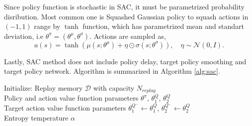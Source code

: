 Since policy function is stochastic in SAC, it must be parametrized probability disribution. Most common one is 
Squashed Gaussian policy to squash actions in $(-1,1)$ range by $\tanh$ function, which has parametrized mean and standart deviation, i.e $\theta^{\pi}=(\theta^{\mu}, \theta^{\sigma})$. Actions are sampled as,
\begin{equation}
\label{eqn:squashed_gp_sampling}
a(s) = \tanh(\mu(s; \theta^{\mu}) + \eta \odot \sigma(s; \theta^{\sigma})), \quad \eta \sim \mathcal{N}(0, I). 
\end{equation}

Lastly, SAC method does not include policy delay, target policy smoothing and target policy network. 
Algorithm is summarized in Algorithm \ref{alg:sac}.
\begin{algorithm}
	\SetAlgoLined
	\DontPrintSemicolon %
	Initialize: Replay memory $\mathcal{D}$ with capacity $N_{replay}$ \\
	Policy and action value function parameters $\theta^{\pi}$, $\theta^Q_1$, $\theta^Q_2$  \\
	Target action value function parameters $\theta^{Q^-}_1 \leftarrow \theta^{Q}_1$, $\theta^{Q^-}_2 \leftarrow \theta^{Q}_2$ \\
	Entropy temperature $\alpha$ \\
\end{algorithm}

